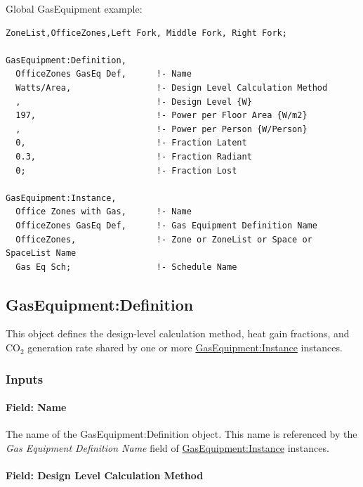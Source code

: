 Global GasEquipment example:

\begin{lstlisting}
ZoneList,OfficeZones,Left Fork, Middle Fork, Right Fork;

GasEquipment:Definition,
  OfficeZones GasEq Def,      !- Name
  Watts/Area,                 !- Design Level Calculation Method
  ,                           !- Design Level {W}
  197,                        !- Power per Floor Area {W/m2}
  ,                           !- Power per Person {W/Person}
  0,                          !- Fraction Latent
  0.3,                        !- Fraction Radiant
  0;                          !- Fraction Lost

GasEquipment:Instance,
  Office Zones with Gas,      !- Name
  OfficeZones GasEq Def,      !- Gas Equipment Definition Name
  OfficeZones,                !- Zone or ZoneList or Space or SpaceList Name
  Gas Eq Sch;                 !- Schedule Name
\end{lstlisting}

\subsection{GasEquipment:Definition}\label{gasequipmentdefinition}

This object defines the design-level calculation method, heat gain fractions, and CO\(_{2}\) generation rate shared by one or more \hyperref[gasequipmentinstance]{GasEquipment:Instance} instances.

\subsubsection{Inputs}\label{inputs-4-gasequipmentdefinition}

\paragraph{Field: Name}\label{field-name-gasequipmentdefinition}

The name of the GasEquipment:Definition object. This name is referenced by the \textit{Gas Equipment Definition Name} field of \hyperref[gasequipmentinstance]{GasEquipment:Instance} instances.

\paragraph{Field: Design Level Calculation Method}\label{field-design-level-calculation-method-2-gas-definition}

